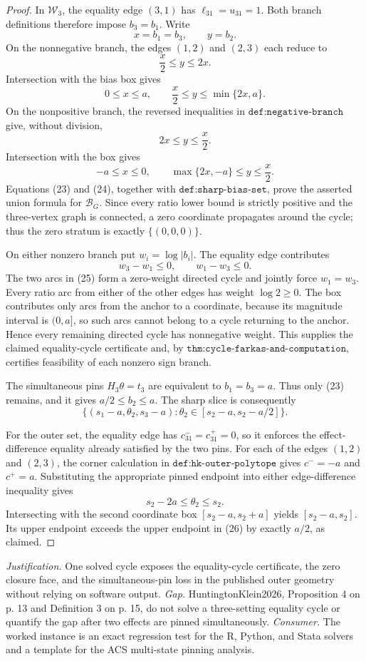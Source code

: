 \documentclass{article}
\begin{document}
\begin{proof}
In \(\mathcal W_3\), the equality edge \((3,1)\) has \(\ell_{31}=u_{31}=1\).  Both branch definitions therefore impose \(b_3=b_1\).  Write
\[
 x=b_1=b_3,
 \qquad y=b_2.
\]
On the nonnegative branch, the edges \((1,2)\) and \((2,3)\) each reduce to
\[
 \frac{x}{2}\le y\le2x.
\]
Intersection with the bias box gives
\[
 0\le x\le a,
 \qquad
 \frac{x}{2}\le y\le\min\{2x,a\}.
\tag{23}
\]
On the nonpositive branch, the reversed inequalities in \(\texttt{def:negative-branch}\) give, without division,
\[
 2x\le y\le\frac{x}{2}.
\]
Intersection with the box gives
\[
 -a\le x\le0,
 \qquad
 \max\{2x,-a\}\le y\le\frac{x}{2}.
\tag{24}
\]
Equations (23) and (24), together with \(\texttt{def:sharp-bias-set}\), prove the asserted union formula for \(\mathcal B_G\).  Since every ratio lower bound is strictly positive and the three-vertex graph is connected, a zero coordinate propagates around the cycle; thus the zero stratum is exactly \(\{(0,0,0)\}\).

On either nonzero branch put \(w_i=\log|b_i|\).  The equality edge contributes
\[
 w_3-w_1\le0,
 \qquad
 w_1-w_3\le0.
\tag{25}
\]
The two arcs in (25) form a zero-weight directed cycle and jointly force \(w_1=w_3\).  Every ratio arc from either of the other edges has weight \(\log2\ge0\).  The box contributes only arcs from the anchor to a coordinate, because its magnitude interval is \((0,a]\), so such arcs cannot belong to a cycle returning to the anchor.  Hence every remaining directed cycle has nonnegative weight.  This supplies the claimed equality-cycle certificate and, by \(\texttt{thm:cycle-farkas-and-computation}\), certifies feasibility of each nonzero sign branch.

The simultaneous pins \(H_3\theta=t_3\) are equivalent to \(b_1=b_3=a\).  Thus only (23) remains, and it gives \(a/2\le b_2\le a\).  The sharp slice is consequently
\[
 \{(s_1-a,\theta_2,s_3-a):
       \theta_2\in[s_2-a,s_2-a/2]\}.
\tag{26}
\]

For the outer set, the equality edge has \(c_{31}^-=c_{31}^+=0\), so it enforces the effect-difference equality already satisfied by the two pins.  For each of the edges \((1,2)\) and \((2,3)\), the corner calculation in \(\texttt{def:hk-outer-polytope}\) gives \(c^-=-a\) and \(c^+=a\).  Substituting the appropriate pinned endpoint into either edge-difference inequality gives
\[
 s_2-2a\le\theta_2\le s_2.
\]
Intersecting with the second coordinate box \([s_2-a,s_2+a]\) yields \([s_2-a,s_2]\).  Its upper endpoint exceeds the upper endpoint in (26) by exactly \(a/2\), as claimed.
\end{proof}
\par\smallskip\noindent \textit{Justification.} One solved cycle exposes the equality-cycle certificate, the zero closure face, and the simultaneous-pin loss in the published outer geometry without relying on software output. \textit{Gap.} HuntingtonKlein2026, Proposition 4 on p. 13 and Definition 3 on p. 15, do not solve a three-setting equality cycle or quantify the gap after two effects are pinned simultaneously. \textit{Consumer.} The worked instance is an exact regression test for the R, Python, and Stata solvers and a template for the ACS multi-state pinning analysis.
\end{document}
